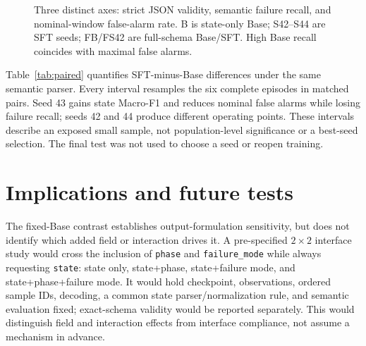 \documentclass{article}
\begin{document}
\begin{figure}[t]
\centering
\resizebox{0.88\textwidth}{!}{}
\caption{Three distinct axes: strict JSON validity, semantic failure recall, and nominal-window false-alarm rate. B is state-only Base; S42--S44 are SFT seeds; FB/FS42 are full-schema Base/SFT. High Base recall coincides with maximal false alarms.}
\label{fig:tradeoff}
\end{figure}

Table~\ref{tab:paired} quantifies SFT-minus-Base differences under the same semantic parser. Every interval resamples the six complete episodes in matched pairs. Seed 43 gains state Macro-F1 and reduces nominal false alarms while losing failure recall; seeds 42 and 44 produce different operating points. These intervals describe an exposed small sample, not population-level significance or a best-seed selection. The final test was not used to choose a seed or reopen training.

\begin{table}[t]
\centering\scriptsize
\resizebox{\textwidth}{!}{}
\caption{State-only SFT minus state-only Base; paired episode-bootstrap 95\% intervals, 2{,}000 deterministic draws. N-FA is a nominal-window rate.}
\label{tab:paired}
\end{table}

\FloatBarrier
\noindent{}

\section{Implications and future tests}
The fixed-Base contrast establishes output-formulation sensitivity, but does not identify which added field or interaction drives it. A pre-specified $2\times2$ interface study would cross the inclusion of \texttt{phase} and \texttt{failure\_mode} while always requesting \texttt{state}: state only, state+phase, state+failure mode, and state+phase+failure mode. It would hold checkpoint, observations, ordered sample IDs, decoding, a common state parser/normalization rule, and semantic evaluation fixed; exact-schema validity would be reported separately. This would distinguish field and interaction effects from interface compliance, not assume a mechanism in advance.
\end{document}
